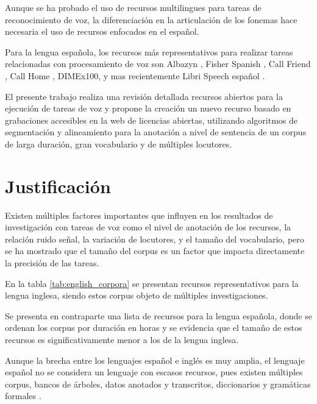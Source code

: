 \documentclass[a4paper,12pt,twoside]{report}
\begin{document}
Aunque se ha probado el uso de recursos multilingues para tareas de reconocimiento de voz, la diferenciación en la articulación de los fonemas hace necesaria el uso de recursos enfocados en el español.

Para la lengua española, los recursos más representativos para realizar tareas relacionadas con procesamiento de voz son Albazyn \cite{CampilloAlbayzinEvaluation}, Fisher Spanish \cite{FischerSpa}, Call Friend \cite{CALLFRIENDSpa}, Call Home \cite{CALLHOMESpa}, DIMEx100\cite{Pineda2004DIMEx100:Spanish}, y mas recientemente Libri Speech español \cite{LibriVox-Spanish}.



El presente trabajo realiza una revisión detallada recursos abiertos para la ejecución de tareas de voz y propone la creación un nuevo recurso basado en grabaciones accesibles en la web de licencias abiertas, utilizando algoritmos de segmentación y alineamiento para la anotación a nivel de sentencia de un corpus de larga duración, gran vocabulario y de múltiples locutores.


\section{Justificación}


Existen múltiples factores importantes que influyen en los resultados de investigación con tareas de voz como el nivel de anotación de los recursos, la relación ruido señal, la variación de locutores, y el tamaño del vocabulario, pero se ha mostrado que el tamaño del corpus es un factor que impacta directamente la precisión de las tareas.

En la tabla \ref{tab:english_corpora} se presentan recursos representativos para la lengua inglesa, siendo estos corpus objeto de múltiples investigaciones.



Se presenta en contraparte una lista de recursos para la lengua española, donde se ordenan los corpus por duración en horas y se evidencia que el tamaño de estos recursos es significativamente  menor a los de la lengua inglesa.




Aunque la brecha entre los lenguajes español e inglés es muy amplia, el lenguaje español no se considera un lenguaje con escasos recursos, pues existen múltiples corpus, bancos de árboles, datos anotados y transcritos, diccionarios y gramáticas formales \cite{CavarGlobalGORILLA}. 
\end{document}
